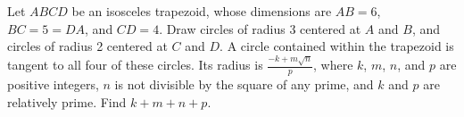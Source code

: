 Let $ABCD$ be an isosceles trapezoid, whose dimensions are $AB = 6$, $BC=5=DA$, and $CD=4$. Draw circles of radius 3 centered at $A$ and $B$, and circles of radius 2 centered at $C$ and $D$. A circle contained within the trapezoid is tangent to all four of these circles. Its radius is $\frac{-k+m\sqrt{n}}p$, where $k$, $m$, $n$, and $p$ are positive integers, $n$ is not divisible by the square of any prime, and $k$ and $p$ are relatively prime. Find $k+m+n+p$.